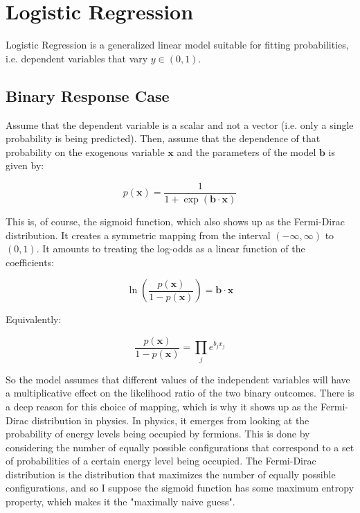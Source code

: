 \section{Logistic Regression}

Logistic Regression is a generalized linear model suitable for fitting probabilities, i.e. dependent variables that vary $y\in (0,1)$. 

\subsection{Binary Response Case}
Assume that the dependent variable is a scalar and not a vector (i.e. only a single probability is being predicted). Then, assume that the dependence of that probability on the exogenous variable $\mathbf{x}$ and the parameters of the model $\mathbf{b}$ is given by:

\begin{equation}
p(\mathbf{x}) = \frac{1}{1+\exp(\mathbf{b\cdot x})}
\end{equation}

This is, of course, the sigmoid function, which also shows up as the Fermi-Dirac distribution. It creates a symmetric mapping from the interval $(-\infty,\infty)$ to $(0,1)$. It amounts to treating the log-odds as a linear function of the coefficients: 

\begin{equation}
\ln\left(\frac{p(\mathbf{x})}{1-p(\mathbf{x})}\right) = \mathbf{b \cdot x}
\end{equation}

Equivalently:

\begin{equation}
\frac{p(\mathbf{x})}{1-p(\mathbf{x})} = \prod_j e^{b_j x_j}
\end{equation}

So the model assumes that different values of the independent variables will have a multiplicative effect on the likelihood ratio of the two binary outcomes. There is a deep reason for this choice of mapping, which is why it shows up as the Fermi-Dirac distribution in physics. In physics, it emerges from looking at the probability of energy levels being occupied by fermions. This is done by considering the number of equally possible configurations that correspond to a set of probabilities of a certain energy level being occupied. The Fermi-Dirac distribution is the distribution that maximizes the number of equally possible configurations, and so I suppose the sigmoid function has some maximum entropy property, which makes it the "maximally naive guess". 

